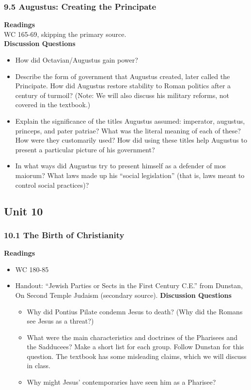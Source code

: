 \documentclass{article}
\begin{document}
\subsubsection*{9.5 Augustus: Creating the Principate}
\textbf{Readings} \\
WC 165-69, skipping the primary source. \\
\textbf{Discussion Questions}
\begin{itemize}
  \item How did Octavian/Augustus gain power?
  \item Describe the form of government that Augustus created, later called the Principate.
  How did Augustus restore stability to Roman politics after a century of turmoil? (Note:
  We will also discuss his military reforms, not covered in the textbook.)
  \item Explain the significance of the titles Augustus assumed: imperator, augustus,
  princeps, and pater patriae? What was the literal meaning of each of these? How were
  they customarily used? How did using these titles help Augustus to present a particular
  picture of his government?
  \item In what ways did Augustus try to present himself as a defender of mos maiorum?
  What laws made up his “social legislation” (that is, laws meant to control social
  practices)?
\end{itemize}
\subsection*{Unit 10}
\subsubsection*{10.1 The Birth of Christianity}
\textbf{Readings}
\begin{itemize}
  \item WC 180-85
  \item Handout: “Jewish Parties or Sects in the First Century C.E.” from Dunstan, On
  Second Temple Judaism (secondary source).
  \textbf{Discussion Questions}
  \begin{itemize}
    \item Why did Pontius Pilate condemn Jesus to death? (Why did the Romans see Jesus
    as a threat?)
    \item What were the main characteristics and doctrines of the Pharisees and the
    Sadducees? Make a short list for each group. Follow Dunstan for this question. The
    textbook has some misleading claims, which we will discuss in class.
    \item Why might Jesus’ contemporaries have seen him as a Pharisee?
  \end{itemize}
\end{itemize}
\end{document}
